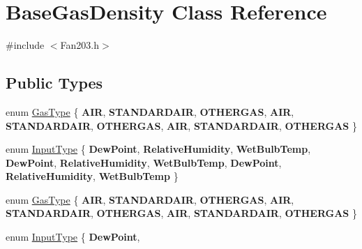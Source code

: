 \hypertarget{class_base_gas_density}{}\section{Base\+Gas\+Density Class Reference}
\label{class_base_gas_density}


{\ttfamily \#include $<$Fan203.\+h$>$}

\subsection*{Public Types}
\begin{DoxyCompactItemize}
\item 
enum \hyperlink{class_base_gas_density_afb215e48f6193462521b7e8d47306ed3}{Gas\+Type} \{ \newline
{\bfseries A\+IR}, 
{\bfseries S\+T\+A\+N\+D\+A\+R\+D\+A\+IR}, 
{\bfseries O\+T\+H\+E\+R\+G\+AS}, 
{\bfseries A\+IR}, 
\newline
{\bfseries S\+T\+A\+N\+D\+A\+R\+D\+A\+IR}, 
{\bfseries O\+T\+H\+E\+R\+G\+AS}, 
{\bfseries A\+IR}, 
{\bfseries S\+T\+A\+N\+D\+A\+R\+D\+A\+IR}, 
\newline
{\bfseries O\+T\+H\+E\+R\+G\+AS}
 \}
\item 
enum \hyperlink{class_base_gas_density_a54f846cc4683a49d3904a40fe2986772}{Input\+Type} \{ \newline
{\bfseries Dew\+Point}, 
{\bfseries Relative\+Humidity}, 
{\bfseries Wet\+Bulb\+Temp}, 
{\bfseries Dew\+Point}, 
\newline
{\bfseries Relative\+Humidity}, 
{\bfseries Wet\+Bulb\+Temp}, 
{\bfseries Dew\+Point}, 
{\bfseries Relative\+Humidity}, 
\newline
{\bfseries Wet\+Bulb\+Temp}
 \}
\item 
enum \hyperlink{class_base_gas_density_afb215e48f6193462521b7e8d47306ed3}{Gas\+Type} \{ \newline
{\bfseries A\+IR}, 
{\bfseries S\+T\+A\+N\+D\+A\+R\+D\+A\+IR}, 
{\bfseries O\+T\+H\+E\+R\+G\+AS}, 
{\bfseries A\+IR}, 
\newline
{\bfseries S\+T\+A\+N\+D\+A\+R\+D\+A\+IR}, 
{\bfseries O\+T\+H\+E\+R\+G\+AS}, 
{\bfseries A\+IR}, 
{\bfseries S\+T\+A\+N\+D\+A\+R\+D\+A\+IR}, 
\newline
{\bfseries O\+T\+H\+E\+R\+G\+AS}
 \}
\item 
enum \hyperlink{class_base_gas_density_a54f846cc4683a49d3904a40fe2986772}{Input\+Type} \{ \newline
{\bfseries Dew\+Point}, 

\end{DoxyCompactItemize}
